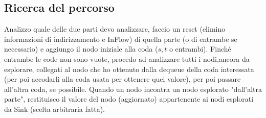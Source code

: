 \documentclass{article}
\begin{document}
\subsection{Ricerca del percorso}

Analizzo quale delle due parti devo analizzare, faccio un reset (elimino informazioni di indirizzamento e InFlow) di quella parte (o di entrambe se necessario) e aggiungo il nodo iniziale alla coda ($s,t$ o entrambi).
Finché entrambe le code non sono vuote, procedo ad analizzare tutti i nodi,ancora da esplorare, collegati al nodo che ho ottenuto dalla dequeue della coda interessata (per poi accodarli alla coda usata per ottenere quel valore), per poi passare all'altra coda, se possibile.
Quando un nodo incontra un nodo esplorato "dall'altra parte", restituisco il valore del nodo (aggiornato) appartenente ai nodi esplorati da Sink (scelta arbitraria fatta).
\end{document}

